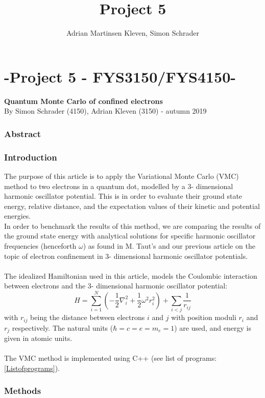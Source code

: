 \documentclass[10pt,a4paper]{article}
\author{Adrian Martinsen Kleven, Simon Schrader}
\title{Project 5}
\begin{document}
\part*{-Project 5 - FYS3150/FYS4150-
}
{\large \textbf{Quantum Monte Carlo of confined electrons}}\\
{\large By Simon Schrader (4150), Adrian Kleven (3150) - autumn 2019
}
\tableofcontents

\listoffigures
\listoftables


\clearpage

\section{Abstract}


\section{Introduction}
The purpose of this article is to apply the Variational Monte Carlo (VMC) method to two electrons in a quantum dot, modelled by a 3- dimensional harmonic oscillator potential. This is in order to evaluate their ground state energy, relative distance, and the expectation values of their kinetic and potential energies.\\In order to benchmark the results of this method, we are comparing the results of the ground state energy with analytical solutions for specific harmonic oscillator frequencies (henceforth $\omega$) as found in M. Taut's \cite{PhysRevA.48.3561} and our previous article \cite{Project2} on the topic of electron confinement in 3- dimensional harmonic oscillator potentials.\\\\The idealized Hamiltonian used in this article, models the Coulombic interaction between electrons and the 3- dimensional harmonic oscillator potential: 
\begin{equation}
  \label{eq:finalH}
  \hat{H}=\sum_{i=1}^{N} \left(  -\frac{1}{2} \nabla_i^2 + \frac{1}{2} \omega^2r_i^2  \right)+\sum_{i<j}\frac{1}{r_{ij}}
\end{equation}
\cite{Problem_set_5} with $r_{ij}$ being the distance between electrons $i$ and $j$ with position moduli $r_i$ and $r_j$ respectively. The natural units ($\hbar = c = e = m_e =1$) are used, and energy is given in atomic units. \\\\The VMC method is implemented using C++ (see list of programs: \ref{Listofprograms}).
\section{Methods}
\end{document}
